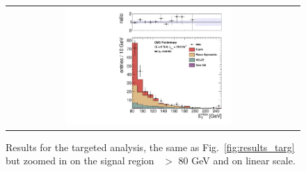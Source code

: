 \begin{figure}[!h]
\begin{center}
\begin{tabular}{cc}
\includegraphics[width=0.6\textwidth]{plots/pfmet_bveto_all_19p5fb_zoom80.pdf}
\end{tabular}
\caption{ Results for the targeted analysis, the same as Fig.~\ref{fig:results_targ} but zoomed in on the signal region \MET\ $>$ 80 GeV and on linear scale.
\label{fig:results_targ_zoom}
}
\end{center}
\end{figure}

\clearpage
